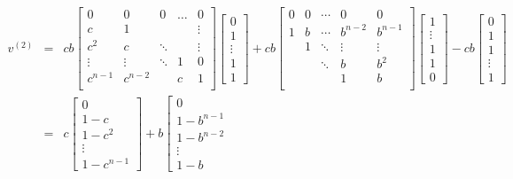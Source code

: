 \begin{eqnarray*}
v^{(2)}
&=&
c b
\left[
\begin{array}{ccccc}
0         & 0         & 0      & \hdots   & 0 \\
c         & 1         &        &          & \vdots  \\
c^2       & c         & \ddots &          & \vdots  \\
\vdots    & \vdots    & \ddots & 1        & 0  \\
c^{n-1} & c^{n-2} &        & c        & 1 \\
\end{array}
\right]
\left[
\begin{array}{c}
0\\1\\\vdots\\1\\1
\end{array}
\right]
+
c b
\left[
\begin{array}{ccccc}
0    & 0       & \cdots  & 0        & 0\\
1    & b       & \cdots  & b^{n-2}  & b^{n-1}\\
     & 1       & \ddots  & \vdots   & \vdots\\
     &         & \ddots  & b        & b^2\\
     &         &         & 1        & b\\
\end{array}
\right]
\left[
\begin{array}{c}
1\\\vdots\\1\\1\\0
\end{array}
\right]
-
c b
\left[
\begin{array}{c}
0\\1\\1\\\vdots\\1
\end{array}
\right]\\
&=&
c
\left[
\begin{array}{c}
0\\1-c\\1-c^2\\\vdots\\1-c^{n-1}
\end{array}
\right]
+
b
\left[
\begin{array}{c}
0\\1-b^{n-1}\\1-b^{n-2}\\\vdots\\1-b

\end{array}
\end{eqnarray*}
